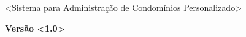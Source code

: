 \documentclass[a4paper,12pt]{article}
\begin{document}
{\raggedleft
{\textless}Sistema para Administração de Condomínios Personalizado{\textgreater}
\par}

{\raggedleft
\textbf{Vers\~ao {\textless}1.0{\textgreater}}
\par}
\end{document}
